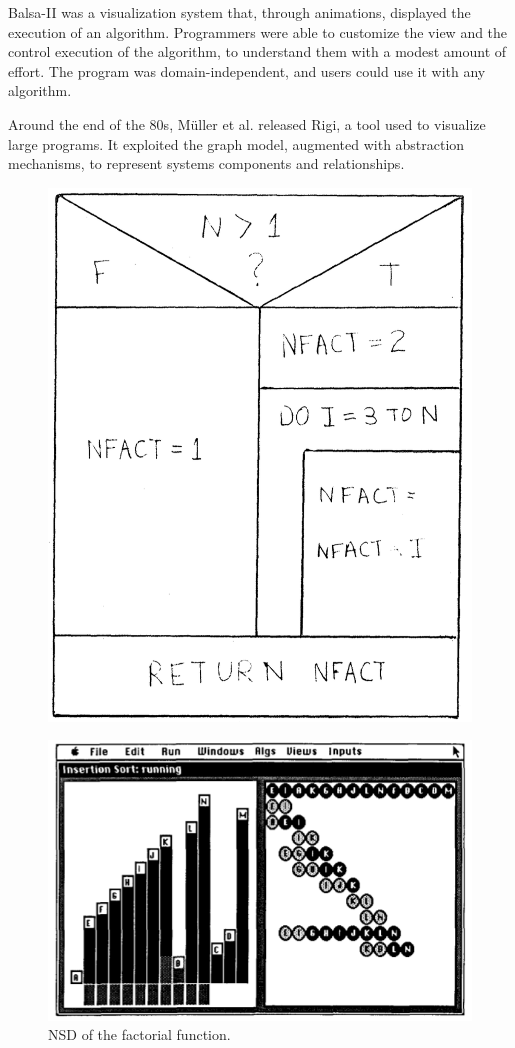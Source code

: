 Balsa-II was a visualization system that, through animations, displayed the execution of an algorithm.
Programmers were able to customize the view and the control execution of the algorithm, to understand them with a modest amount of effort. 
The program was domain-independent, and users could use it with any algorithm. 



Around the end of the 80s, Müller et al. \cite{Mueller1988} released Rigi, a tool used to visualize large programs.
It exploited the graph model, augmented with abstraction mechanisms, to represent systems components and relationships. 

\begin{figure}[H]
    \includegraphics[width=0.8\linewidth]{Nassi1973_NSD.png}
    \label{fig:Nassi1973_NSD}
    \caption{NSD of the factorial function.}
  \endminipage\hfill
    \includegraphics[width=\linewidth]{Brown1988_BalsaII.png}

\end{figure}
